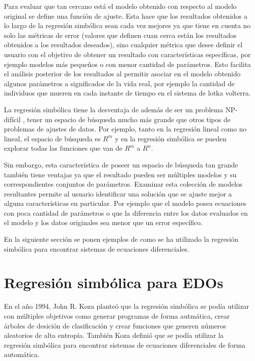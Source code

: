 Para evaluar que tan cercano está el modelo obtenido con respecto al modelo original se define una función de ajuste. Esta hace que los resultados obtenidos a lo largo de la regresión simbólica sean cada vez mejores ya que tiene en cuenta no solo las métricas de error (valores que definen cuan cerca están los resultados obtenidos a los resultados deseados), sino cualquier métrica que desee definir el usuario con el objetivo de obtener un resultado con características específicas, por ejemplo modelos más pequeños o con menor cantidad de parámetros. Esto facilita el análisis posterior de los resultados al permitir asociar en el modelo obtenido algunos parámetros a significados de la vida real, por ejemplo la cantidad de individuos que mueren en cada instante de tiempo en el sistema de lotka volterra.

La regresión simbólica tiene la desventaja de además de ser un problema NP-difícil \cite{virgolin2022symbolic}, tener un espacio de búsqueda mucho más grande que otros tipos de problemas de ajustes de datos. Por ejemplo, tanto en la regresión lineal como no lineal, el espacio de búsqueda es $R^m$ y en la regresión simbólica se pueden explorar todas las funciones que van de $R^m$ a $R^n$.

Sin embargo, esta característica de poseer un espacio de búsqueda tan grande también tiene ventajas ya que el resultado pueden ser múltiples modelos y su correspondientes conjuntos de parámetros. Examinar esta colección de modelos resultantes permite al usuario identificar una solución que se ajuste mejor a alguna características en particular. Por ejemplo que el modelo posea ecuaciones con poca cantidad de parámetros o que la diferencia entre los datos evaluados en el modelo y los datos originales sea menor que un error específico.

En la siguiente sección se ponen ejemplos de como se ha utilizado la regresión simbólica para encontrar sistemas de ecuaciones diferenciales.

\section{Regresión simbólica para EDOs}

En el año 1994, John R. Koza planteó que la regresión simbólica se podía utilizar con múltiples objetivos como generar programas de forma autmática, crear árboles de desición de clasificación y crear funciones que generen números aleatorios de alta entropía. También Koza definió que se podía utilizar la regresión simbólica para encontrar sistemas de ecuaciones diferenciales de forma automática.\cite{koza1994genetic}

